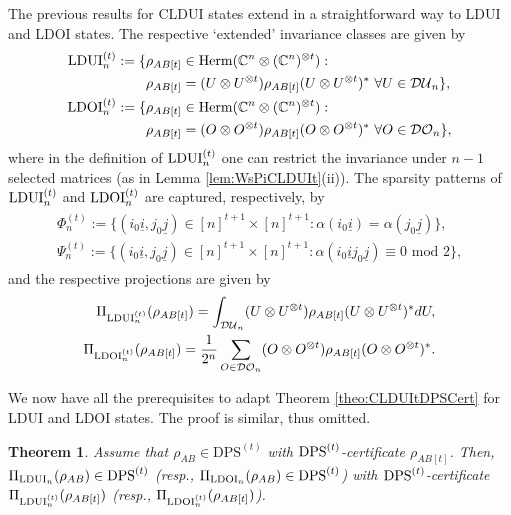 \documentclass[11pt]{article}
\newcommand{\C}{\ensuremath{\mathbb{C}}} %
\newcommand{\MDU}{{\mathcal {DU}}}
\newcommand{\MDO}{{\mathcal {DO}}}
\newcommand{\Herm}{\mathrm{Herm}}
\newcommand{\LDUI}{\text{\rm LDUI}}
\newcommand{\LDOI}{\text{\rm LDOI}}
\newcommand{\DPS}{\text{\rm DPS}}
\newcommand{\DPSt}{\mathrm{DPS}^{(t)}}
\newcommand{\ot}{\otimes}
\newcommand{\ui}{\underline{i}}
\newcommand{\uj}{\underline{j}}
\theoremstyle{plain}
\newtheorem{theorem}[satz]{Theorem}
\begin{document}
The previous results  for CLDUI states extend in a straightforward way to LDUI and LDOI states. The respective `extended' invariance classes are given by
\begin{align*}%
    \LDUI^{(t)}_n:=\{& \rho_{AB[t]}\in\Herm(\C^n\ot(\C^n)^{\ot t}):\\
    & \rho_{AB[t]}= (U\ot U^{\ot t}) \rho_{AB[t]} (U\ot U^{\ot t})^* \ \forall U\in\MDU_n\},\\
    \LDOI^{(t)}_n:=\{& \rho_{AB[t]}\in\Herm(\C^n\ot(\C^n)^{\ot t}): \\
    & \rho_{AB[t]}= (O\ot O^{\ot t}) \rho_{AB[t]} (O\ot O^{\ot t})^* \ \forall O\in\MDO_n\},
\end{align*}
where in the definition of $\LDUI^{(t)}_n$ one can restrict the invariance under $n-1$ selected matrices (as in Lemma \ref{lem:WsPiCLDUIt}(ii)).
The sparsity patterns of $\LDUI^{(t)}_n$ and $\LDOI^{(t)}_n$ are   captured, respectively, by 
\begin{align}\label{def:Psit}\begin{split}
    \Phi_n^{(t)}:=\{(i_0\ui,j_0\uj)\in[n]^{t+1}\times[n]^{t+1}:\alpha(i_0\ui)=\alpha(j_0\uj)\},\\
    \Psi_n^{(t)}:=\{(i_0\ui,j_0\uj)\in[n]^{t+1}\times[n]^{t+1}:\alpha(i_0\ui j_0\uj)\equiv0\text{ mod }2\},
\end{split}\end{align}
and the respective projections are given by %
\begin{align*}%
    \Pi_{\LDUI^{(t)}_n}(\rho_{AB[t]})=\int_{\MDU_n}(U\ot U^{\ot t})\rho_{AB[t]}(U\ot U^{\ot t})^*dU,\\
%
    \Pi_{\LDOI^{(t)}_n}(\rho_{AB[t]})=\frac{1}{2^n}\sum_{O\in\MDO_n}(O\ot O^{\ot t})\rho_{AB[t]}(O\ot O^{\ot t})^*.
\end{align*}

We now have all the prerequisites to adapt Theorem \ref{theo:CLDUItDPSCert} for LDUI and LDOI states.
The proof is similar, thus omitted.
\begin{theorem}\label{theo:LDUILDOItDPSCert}
   Assume that  $\rho_{AB}\in\DPSt$ with $\DPS^{(t)}$-certificate $\rho_{AB[t]}$. Then, $\Pi_{\LDUI_n}(\rho_{AB})\in\DPS^{(t)}$ (resp., $\Pi_{\LDOI_n}(\rho_{AB})\in\DPS^{(t)}$) with $\DPS^{(t)}$-certificate $\Pi_{\LDUI^{(t)}_n}(\rho_{AB[t]})$ (resp., $\Pi_{\LDOI^{(t)}_n}(\rho_{AB[t]})$). 
\end{theorem}
\end{document}

